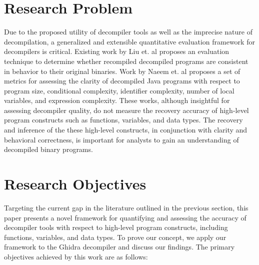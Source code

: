 \section{Research Problem}

Due to the proposed utility of decompiler tools as well as the imprecise nature of decompilation, a generalized and extensible quantitative evaluation framework for decompilers is critical. Existing work by Liu et. al \cite{bib:how-far-weve-come} proposes an evaluation technique to determine whether recompiled decompiled programs are consistent in behavior to their original binaries. Work by Naeem et. al \cite{bib:metrics-effectiveness-decompilers} proposes a set of metrics for assessing the clarity of decompiled Java programs with respect to program size, conditional complexity, identifier complexity, number of local variables, and expression complexity. These works, although insightful for assessing decompiler quality, do not measure the recovery accuracy of high-level program constructs such as functions, variables, and data types. The recovery and inference of the these high-level constructs, in conjunction with clarity and behavioral correctness, is important for analysts to gain an understanding of decompiled binary programs.

\section{Research Objectives}

Targeting the current gap in the literature outlined in the previous section, this paper presents a novel framework for quantifying and assessing the accuracy of decompiler tools with respect to high-level program constructs, including functions, variables, and data types. To prove our concept, we apply our framework to the Ghidra decompiler and discuss our findings. The primary objectives achieved by this work are as follows:

